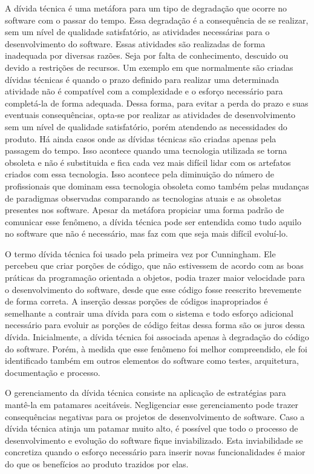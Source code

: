 A dívida técnica é uma metáfora para um tipo de degradação que ocorre no software com o passar do tempo. Essa degradação é a consequência de se realizar, sem um nível de qualidade satisfatório, as atividades necessárias para o desenvolvimento do software. Essas atividades são realizadas de forma inadequada por diversas razões. Seja por falta de conhecimento, descuido ou devido a restrições de recursos. Um exemplo em que normalmente são criadas dívidas técnicas é quando o prazo definido para realizar uma determinada atividade não é compatível com a complexidade e o esforço necessário para completá-la de forma adequada. Dessa forma, para evitar a perda do prazo e suas eventuais consequências, opta-se por realizar as atividades de desenvolvimento sem um nível de qualidade satisfatório, porém atendendo as necessidades do produto. Há ainda casos onde as dívidas técnicas são criadas apenas pela passagem do tempo. Isso acontece quando uma tecnologia utilizada se torna obsoleta e não é substituida e fica cada vez  mais difícil lidar com os artefatos criados com essa tecnologia. Isso acontece pela diminuição do número de profissionais que dominam essa tecnologia obsoleta como também pelas mudanças de paradigmas observadas comparando as tecnologias atuais e as obsoletas presentes nos software. Apesar da metáfora propiciar uma forma padrão de comunicar esse fenômeno, a  dívida técnica pode ser entendida como tudo aquilo no software que não é necessário, mas faz com que seja mais difícil evoluí-lo.

O termo dívida técnica foi usado pela primeira vez por Cunningham\cite{cunningham1993wycash}. Ele percebeu que criar porções de código, que não estivessem de acordo com as boas práticas da programação orientada a objetos, podia trazer maior velocidade para o desenvolvimento do software, desde que esse código fosse reescrito brevemente de forma correta. A inserção dessas porções de códigos inapropriados é semelhante a contrair uma dívida para com  o sistema e todo esforço adicional necessário para evoluir as porções de código feitas dessa forma são os juros dessa dívida. Inicialmente, a dívida técnica foi associada apenas à degradação do código do software. Porém, à medida que esse fenômeno foi melhor compreendido, ele foi identificado também em outros elementos do software como testes, arquitetura, documentação e processo. 


O gerenciamento da dívida técnica consiste na aplicação de estratégias para mantê-la em patamares aceitáveis. Negligenciar esse gerenciamento pode trazer consequências negativas para os projetos de desenvolvimento de software. Caso a dívida técnica atinja um patamar muito alto, é possível que todo o processo de desenvolvimento e evolução do software fique inviabilizado. Esta inviabilidade se concretiza quando o esforço necessário para inserir novas funcionalidades é maior do que os benefícios ao produto trazidos por elas.




